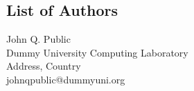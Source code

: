 \documentclass[a4paper,UKenglish]{lipicsmaster-v2018}
\begin{document}
\begin{participants}
\chapter[Authors]{List of Authors}
\participant John Q. Public\\ 
  Dummy University Computing Laboratory\\
  Address, Country\\
  johnqpublic@dummyuni.org

\end{participants} 
\end{document}
